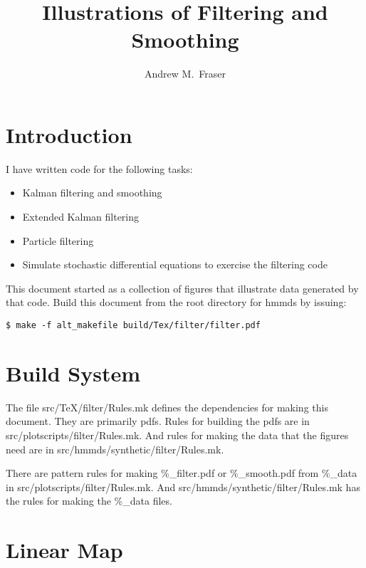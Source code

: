 \documentclass[12pt]{article}
\title{Illustrations of Filtering and Smoothing}
\author{Andrew M.\ Fraser}
\begin{document}
\maketitle

\section{Introduction}
\label{sec:introduction}

I have written code for the following tasks:
\begin{itemize}
\item Kalman filtering and smoothing
\item Extended Kalman filtering
\item Particle filtering
\item Simulate stochastic differential equations to exercise the
  filtering code
\end{itemize}
This document started as a collection of figures that illustrate data
generated by that code.  Build this document from the root directory
for hmmds by issuing:
\begin{verbatim}
$ make -f alt_makefile build/Tex/filter/filter.pdf
\end{verbatim}

\section{Build System}

The file src/TeX/filter/Rules.mk defines the dependencies for making
this document.  They are primarily pdfs.  Rules for building the pdfs
are in src/plotscripts/filter/Rules.mk.  And rules for making the data
that the figures need are in src/hmmds/synthetic/filter/Rules.mk.

There are pattern rules for making \%\_filter.pdf or \%\_smooth.pdf from
\%\_data in src/plotscripts/filter/Rules.mk.  And
src/hmmds/synthetic/filter/Rules.mk has the rules for making the
\%\_data files.

\section{Linear Map}
\label{sec:linear_map}
\end{document}
